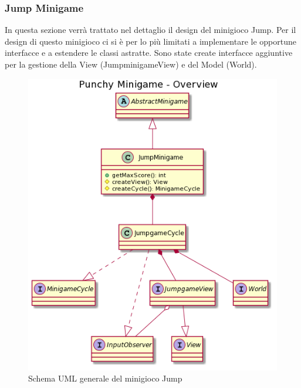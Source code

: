 \documentclass[a4paper,12pt]{report}
\begin{document}
	\subsubsection{Jump Minigame}
	In questa sezione verrà trattato nel dettaglio il design del minigioco Jump.\newline
	\newline
	Per il design di questo minigioco ci si è per lo più limitati a implementare le opportune interfacce e a estendere le classi astratte. Sono state create interfacce aggiuntive per la gestione della View (JumpminigameView) e del Model (World).
    \begin{figure}[!t]
        \centering{}
        \includegraphics[width=140mm]{images/picchiotti/jumpoverview.png}
        \caption{Schema UML generale del minigioco Jump}
        \label{img:jumpoverview}
    \end{figure}
\end{document}
